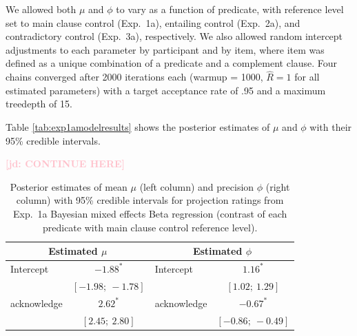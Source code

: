 \documentclass[11pt,fleqn]{article}
\newcommand{\jd}[1]{\textbf{\textcolor{Pink}{[jd: #1]}}}
\newcommand{\6}{\mbox{$[\hspace*{-.6mm}[$}}
\newcommand{\9}{\mbox{$]\hspace*{-.6mm}]$}}
\begin{document}
{We allowed both $\mu$ and $\phi$ to vary as a function of predicate, with reference level set to main clause control (Exp.~1a), entailing control (Exp.~2a), and contradictory control (Exp.~3a), respectively. We also allowed random intercept adjustments to each parameter by participant and by item, where item was defined as a unique combination of a predicate and a complement clause. Four chains converged after 2000 iterations each (warmup = 1000, \(\hat{R}=1\) for all estimated parameters) with a target acceptance rate of .95 and a maximum treedepth of 15.

Table \ref{tab:exp1amodelresults} shows the posterior estimates of $\mu$ and $\phi$ with their 95\% credible intervals.

\jd{CONTINUE HERE}


\begin{table}
\caption{Posterior estimates of mean $\mu$ (left column) and precision $\phi$ (right column) with 95\% credible intervals  for projection ratings from Exp.~1a Bayesian mixed effects Beta regression (contrast of each predicate with main clause control reference level).}
\begin{center}
\begin{tabular}{l c l c}
\toprule
\multicolumn{2}{c}{Estimated $\mu$} & \multicolumn{2}{c}{Estimated $\phi$}\\
\midrule
Intercept & $-1.88^{*}$  &	Intercept  & $1.16^{*}$ \\
		
& $[-1.98;\ -1.78]$ &	& $[1.02;\ 1.29]$  \\
		
acknowledge & $2.62^{*}$ &	 acknowledge & $-0.67^{*}$  \\
		
& $[2.45;\ 2.80]$  &	& $[-0.86;\ -0.49]$ \\
		

\end{tabular}
\end{center}
\end{table}}
\end{document}
